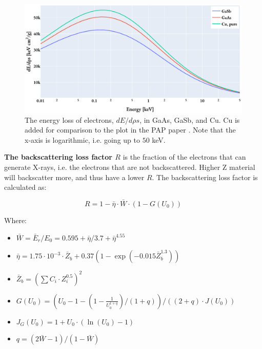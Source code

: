 \begin{figure}[htbp]
    \centering
    \includegraphics[width=0.8\linewidth]{figures/PAP_energy_loss_dE_drhos.pdf}
    \caption{
        The energy loss of electrons, $dE/d\rho s$,  in GaAs, GaSb, and Cu.
        Cu is added for comparison to the plot in the PAP paper \cite[Fig. 4]{pap_1991}.
        Note that the x-axis is logarithmic, i.e. going up to $50$ keV.
    }
    \label{fig:PAP:energy_loss_electrons_dE_drhos}
\end{figure}





\textbf{The backscattering loss factor $R$} is the fraction of the electrons that can generate X-rays, i.e. the electrons that are not backscattered.
Higher Z material will backscatter more, and thus have a lower $R$.
The backscattering loss factor is calculated as:

\begin{equation}
    \label{eq:theory:quantitative:pap:calculation_of_F:R}
    R = 1 - \bar{\eta}  \cdot \bar{W} \cdot (1-G(U_0))
\end{equation}

Where:

\begin{itemize}
    \item  $\bar{W} = \bar{E}_r/E_0 = 0.595 + \bar{\eta}/3.7 + \bar{\eta}^{4.55} $
    \item  $\bar{\eta} = 1.75 \cdot 10^{-3} \cdot \bar{Z}_b + 0.37(1-\exp(-0.015\bar{Z}_b^{1.3})) $
    \item  $\bar{Z}_b = (\sum C_i \cdot Z_i^{0.5})^2$
    \item  $G(U_0) = (U_0 - 1 - (1- \frac{1}{U_0^{1+q}})/(1+q)) / ((2+q)\cdot J(U_0))$
    \item  $J_G(U_0) = 1 + U_0 \cdot (\ln(U_0)-1) $
    \item  $q = (2 \bar{W} - 1) / (1 - \bar{W}) $
\end{itemize}


